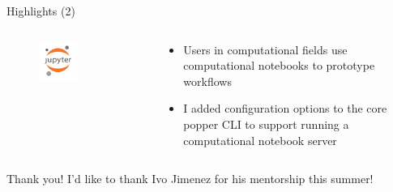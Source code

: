 \documentclass[aspectratio=169, 10pt]{beamer}
\begin{document}
\begin{frame}{Highlights (2)}
    \begin{columns}
        \begin{column}{0.5\textwidth} 
            \begin{center}
                \begin{figure}
                    \includegraphics[width=0.5\textwidth]{images/jupyter.png}
                \end{figure}
            \end{center}
        \end{column}
        \begin{column}{0.5\textwidth}
            \begin{itemize}
                \item Users in computational fields use computational
                notebooks to prototype workflows 
                \item I added configuration options to the core \alert{popper} CLI 
                to support running a computational notebook server
            \end{itemize}
        \end{column}
    \end{columns}  

\end{frame}


\begin{frame}{Thank you!}
    I'd like to thank Ivo Jimenez for his mentorship this summer!
\end{frame}
\end{document}
